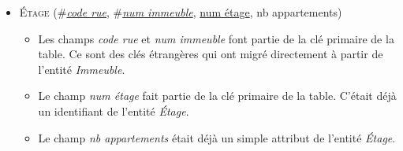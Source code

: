 \documentclass[a4paper]{article}
\newcommand{\relat}[1]{\textsc{#1}}
\newcommand{\attr}[1]{#1}
\newcommand{\prim}[1]{\uline{#1}}
\newcommand{\foreign}[1]{\#\textsl{#1}}
\begin{document}
\begin{itemize}
  \item \relat{Étage} (\foreign{\prim{code rue}}, \foreign{\prim{num immeuble}}, \prim{num étage}, \attr{nb appartements})
  \begin{itemize}
    \item Les champs \emph{code rue} et \emph{num immeuble} font partie de la clé primaire de la table. Ce sont des clés étrangères qui ont migré directement à partir de l'entité \emph{Immeuble}.
    \item Le champ \emph{num étage} fait partie de la clé primaire de la table. C'était déjà un identifiant de l'entité \emph{Étage}.
    \item Le champ \emph{nb appartements} était déjà un simple attribut de l'entité \emph{Étage}.
  \end{itemize}

\end{itemize}
\end{document}
